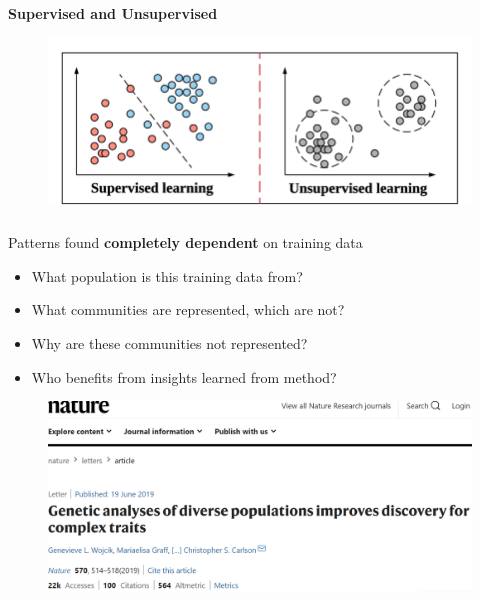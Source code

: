 \documentclass[xcolor=dvipsnames]{beamer}
\begin{document}
\begin{frame}
\frametitle{\insertsectionhead}
\textbf{Supervised and Unsupervised}
\begin{figure}
\includegraphics[scale=0.4]{images/supervised_vs_unsupervised.png}
\end{figure}
\end{frame}

\begin{frame}
\frametitle{\insertsectionhead}
Patterns found \textbf{completely dependent} on training data
\begin{itemize}
\item What population is this training data from?
\item What communities are represented, which are not?
\item Why are these communities not represented?
\item Who benefits from insights learned from method?
\end{itemize}
\begin{figure}
\includegraphics[scale=0.4]{images/nature_disparities.png}
\end{figure}
\end{frame}
\end{document}
